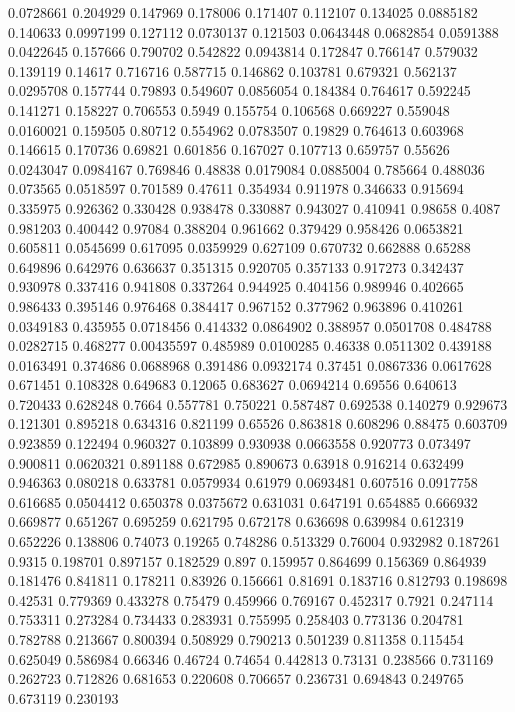 0.0728661 0.204929
0.147969 0.178006
0.171407 0.112107
0.134025 0.0885182
0.140633 0.0997199
0.127112 0.0730137
0.121503 0.0643448
0.0682854 0.0591388
0.0422645 0.157666
0.790702 0.542822
0.0943814 0.172847
0.766147 0.579032
0.139119 0.14617
0.716716 0.587715
0.146862 0.103781
0.679321 0.562137
0.0295708 0.157744
0.79893 0.549607
0.0856054 0.184384
0.764617 0.592245
0.141271 0.158227
0.706553 0.5949
0.155754 0.106568
0.669227 0.559048
0.0160021 0.159505
0.80712 0.554962
0.0783507 0.19829
0.764613 0.603968
0.146615 0.170736
0.69821 0.601856
0.167027 0.107713
0.659757 0.55626
0.0243047 0.0984167
0.769846 0.48838
0.0179084 0.0885004
0.785664 0.488036
0.073565 0.0518597
0.701589 0.47611
0.354934 0.911978
0.346633 0.915694
0.335975 0.926362
0.330428 0.938478
0.330887 0.943027
0.410941 0.98658
0.4087 0.981203
0.400442 0.97084
0.388204 0.961662
0.379429 0.958426
0.0653821 0.605811
0.0545699 0.617095
0.0359929 0.627109
0.670732 0.662888
0.65288 0.649896
0.642976 0.636637
0.351315 0.920705
0.357133 0.917273
0.342437 0.930978
0.337416 0.941808
0.337264 0.944925
0.404156 0.989946
0.402665 0.986433
0.395146 0.976468
0.384417 0.967152
0.377962 0.963896
0.410261 0.0349183
0.435955 0.0718456
0.414332 0.0864902
0.388957 0.0501708
0.484788 0.0282715
0.468277 0.00435597
0.485989 0.0100285
0.46338 0.0511302
0.439188 0.0163491
0.374686 0.0688968
0.391486 0.0932174
0.37451 0.0867336
0.0617628 0.671451
0.108328 0.649683
0.12065 0.683627
0.0694214 0.69556
0.640613 0.720433
0.628248 0.7664
0.557781 0.750221
0.587487 0.692538
0.140279 0.929673
0.121301 0.895218
0.634316 0.821199
0.65526 0.863818
0.608296 0.88475
0.603709 0.923859
0.122494 0.960327
0.103899 0.930938
0.0663558 0.920773
0.073497 0.900811
0.0620321 0.891188
0.672985 0.890673
0.63918 0.916214
0.632499 0.946363
0.080218 0.633781
0.0579934 0.61979
0.0693481 0.607516
0.0917758 0.616685
0.0504412 0.650378
0.0375672 0.631031
0.647191 0.654885
0.666932 0.669877
0.651267 0.695259
0.621795 0.672178
0.636698 0.639984
0.612319 0.652226
0.138806 0.74073
0.19265 0.748286
0.513329 0.76004
0.932982 0.187261
0.9315 0.198701
0.897157 0.182529
0.897 0.159957
0.864699 0.156369
0.864939 0.181476
0.841811 0.178211
0.83926 0.156661
0.81691 0.183716
0.812793 0.198698
0.42531 0.779369
0.433278 0.75479
0.459966 0.769167
0.452317 0.7921
0.247114 0.753311
0.273284 0.734433
0.283931 0.755995
0.258403 0.773136
0.204781 0.782788
0.213667 0.800394
0.508929 0.790213
0.501239 0.811358
0.115454 0.625049
0.586984 0.66346
0.46724 0.74654
0.442813 0.73131
0.238566 0.731169
0.262723 0.712826
0.681653 0.220608
0.706657 0.236731
0.694843 0.249765
0.673119 0.230193

